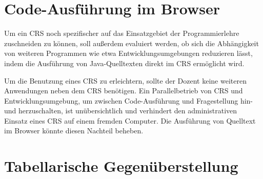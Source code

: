 \section{Code-Ausführung im Browser}
\label{chap:codeausfuehrung}
Um ein CRS noch spezifischer auf das Einsatzgebiet der Programmierlehre zuschneiden zu können, soll außerdem evaluiert werden, ob sich die Abhängigkeit von weiteren Programmen wie etwa Entwicklungsumgebungen reduzieren lässt, indem die Ausführung von Java-Quelltexten direkt im CRS ermöglicht wird.

Um die Benutzung eines CRS zu erleichtern, sollte der Dozent keine weiteren Anwendungen neben dem CRS benötigen. Ein Parallelbetrieb von CRS und Entwicklungsumgebung, um zwischen Code-Ausführung und Fragestellung hin- und herzuschalten, ist unübersichtlich und verhindert den administrativen Einsatz eines CRS auf einem fremden Computer. Die Ausführung von Quelltext im Browser könnte diesen Nachteil beheben.

\newpage
\section{Tabellarische Gegenüberstellung}
\label{chap:tabelle}

